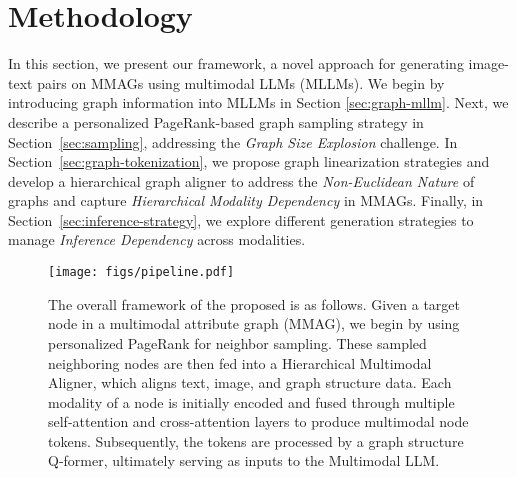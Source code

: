 \section{Methodology}
\label{sec:methodology}
In this section, we present our \Ours framework, a novel approach for generating image-text pairs on MMAGs using multimodal LLMs (MLLMs). 
We begin by introducing graph information into MLLMs in Section \ref{sec:graph-mllm}.
Next, we describe a personalized PageRank-based graph sampling strategy in Section~\ref{sec:sampling}, addressing the \textit{Graph Size Explosion} challenge.
In Section~\ref{sec:graph-tokenization}, we propose graph linearization strategies and develop a hierarchical graph aligner to address the \textit{Non-Euclidean Nature} of graphs and capture \textit{Hierarchical Modality Dependency} in MMAGs.
Finally, in Section~\ref{sec:inference-strategy}, we explore different generation strategies to manage \textit{Inference Dependency} across modalities.


\begin{figure*}
    \centering
    \texttt{[image: figs/pipeline.pdf]}
    \caption{The overall framework of the proposed \Ours is as follows. Given a target node in a multimodal attribute graph (MMAG), we begin by using personalized PageRank for neighbor sampling. These sampled neighboring nodes are then fed into a Hierarchical Multimodal Aligner, which aligns text, image, and graph structure data. Each modality of a node is initially encoded and fused through multiple self-attention and cross-attention layers to produce multimodal node tokens. Subsequently, the tokens are processed by a graph structure Q-former, ultimately serving as inputs to the Multimodal LLM.}
    \label{fig:pipeline}
\end{figure*}


